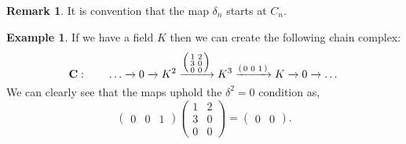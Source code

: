 \documentclass[11.5pt, twoside, a4paper, titlepage]{report}
\theoremstyle{definition}
\newtheorem{rem}[mydef]{Remark}
\newtheorem{eg}[mydef]{Example}
\theoremstyle{plain}
\begin{document}
\begin{rem}
It is convention that the map $\delta_n$ starts at $C_n$.
\end{rem}

\begin{eg}
If we have a field $K$ then we can create the following chain complex:
\begin{equation*}
\mathbf{C}: \qquad \dots \xrightarrow{} 0 \xrightarrow{} K^2 \xrightarrow{\Bigl(\begin{smallmatrix}1&2\\ 3&0\\ 0&0 \end{smallmatrix}\Bigr)} K^3 \xrightarrow{(\begin{smallmatrix}0 & 0 &1\end{smallmatrix})} K \xrightarrow{} 0 \xrightarrow{}\dots
\end{equation*}
We can clearly see that the maps uphold the $\delta^2=0$ condition as,
\begin{equation*}
\begin{pmatrix}0 & 0 &1
\end{pmatrix}
\begin{pmatrix}
1 & 2 \\
3 & 0\\
0 & 0
\end{pmatrix}
=\begin{pmatrix}
0 & 0
\end{pmatrix}.
\end{equation*}
\end{eg}
\end{document}
